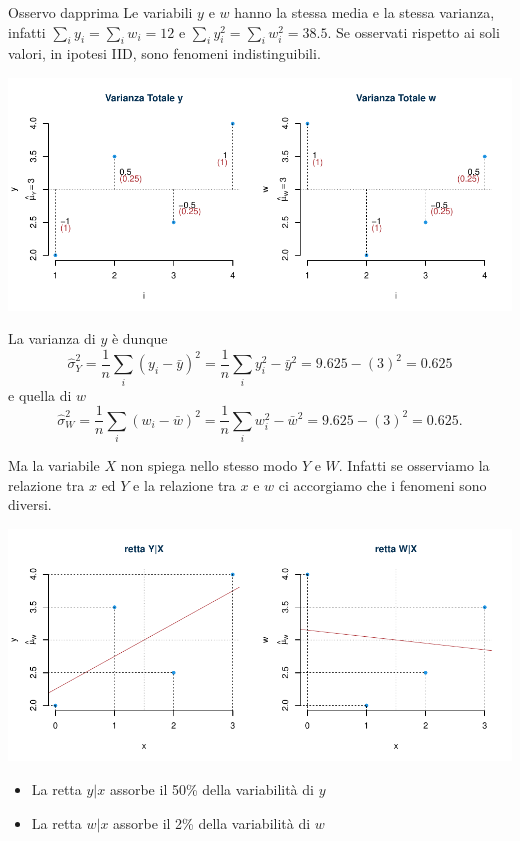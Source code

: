 \documentclass[
  11pt,
]{book}
\providecommand{\tightlist}{%
  \setlength{\itemsep}{0pt}\setlength{\parskip}{0pt}}
\theoremstyle{mytheoremstyle}
\theoremstyle{mydefstyle}
\begin{document}
Osservo dapprima Le variabili \(y\) e \(w\) hanno la stessa media e la stessa varianza, infatti
\(\sum_i y_i = \sum_i w_i=12\) e \(\sum_i y_i^2=\sum_i w_i^2=38.5\).
Se osservati rispetto ai soli valori, in ipotesi IID, sono fenomeni indistinguibili.

\begin{center}\includegraphics{Appunti_di_Statistica_2025_files/figure-latex/17-regressione-I-62-1} \end{center}

La varianza di \(y\) è dunque
\[
\hat\sigma_Y^2=\frac 1 n\sum_i (y_i - \bar y)^2 =\frac 1 n\sum_i y_i^2 - \bar y^2 =9.625 - (3)^2=0.625
\]
e quella di \(w\)
\[
\hat\sigma_W^2=\frac 1 n\sum_i (w_i - \bar w)^2 =\frac 1 n\sum_i w_i^2 - \bar w^2 =9.625 - (3)^2=0.625.
\]

Ma la variabile \(X\) non spiega nello stesso modo \(Y\) e \(W\). Infatti se osserviamo la relazione tra \(x\) ed \(Y\) e la relazione tra \(x\) e \(w\) ci accorgiamo che i fenomeni sono diversi.

\begin{center}\includegraphics{Appunti_di_Statistica_2025_files/figure-latex/17-regressione-I-63-1} \end{center}

\begin{itemize}
\tightlist
\item
  La retta \(y|x\) assorbe il 50\% della variabilità di \(y\)
\item
  La retta \(w|x\) assorbe il 2\% della variabilità di \(w\)
\end{itemize}
\end{document}
